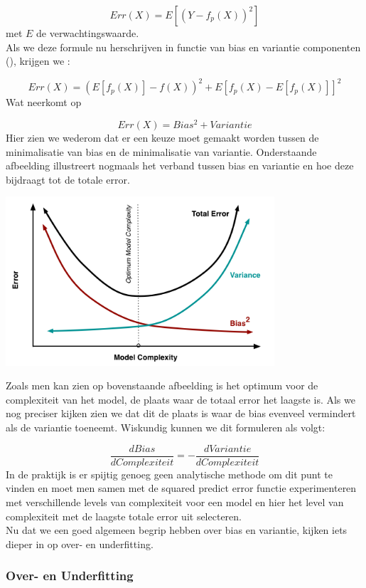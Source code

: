 \[ Err(X)=E[(Y - f_{p}(X))^2] \]
%
met $E$ de verwachtingswaarde.\\
%
Als we deze formule nu herschrijven in functie van bias en variantie componenten (\cite{hastie2009elements}), krijgen we :

\[ Err(X)=(E[f_{p}(X)] - f(X))^2+E[f_{p}(X) - E[f_{p}(X)]]^2 \]
%
Wat neerkomt op 

\[Err(X)= Bias^2 + Variantie \]
%
Hier zien we wederom dat er een keuze moet gemaakt worden tussen de minimalisatie van bias en de minimalisatie van variantie.
Onderstaande afbeelding illustreert nogmaals het verband tussen bias en variantie en hoe deze bijdraagt tot de totale error.
\begin{center}
  \includegraphics[width=10cm]{biasvariance_tradeoff}
  \label{fig:biasvariance}
\end{center}
\newline
Zoals men kan zien op bovenstaande afbeelding is het optimum voor de complexiteit van het model, de plaats waar de totaal error het laagste is. Als we nog preciser kijken zien we dat dit de plaats is waar de bias evenveel vermindert als de variantie toeneemt. Wiskundig kunnen we dit formuleren als volgt:

\[\frac{dBias}{dComplexiteit} = -\frac{dVariantie}{dComplexiteit} \]
%
In de praktijk is er spijtig genoeg geen analytische methode om dit punt te vinden en moet men samen met de squared predict error functie experimenteren met verschillende levels van complexiteit voor een model en hier het level van complexiteit met de laagste totale error uit selecteren.\\
%
Nu dat we een goed algemeen begrip hebben over bias en variantie, kijken iets dieper in op over- en underfitting.

\subsubsection{Over- en Underfitting}\label{Over- en Underfitting}

